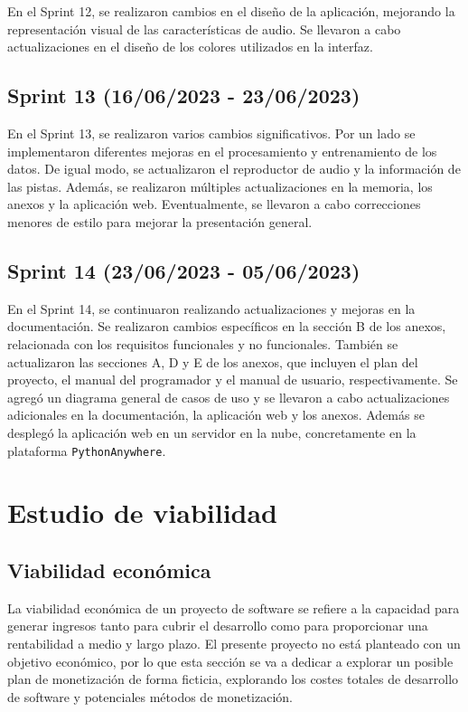 En el Sprint 12, se realizaron cambios en el diseño de la aplicación, mejorando la representación visual de las características de audio. Se llevaron a cabo actualizaciones en el diseño de los colores utilizados en la interfaz.

\subsection{Sprint 13 (16/06/2023 - 23/06/2023)}

En el Sprint 13, se realizaron varios cambios significativos. Por un lado se implementaron diferentes mejoras en el procesamiento y entrenamiento de los datos. De igual modo, se actualizaron el reproductor de audio y la información de las pistas. Además, se realizaron múltiples actualizaciones en la memoria, los anexos y la aplicación web. Eventualmente, se llevaron a cabo correcciones menores de estilo para mejorar la presentación general.

\subsection{Sprint 14 (23/06/2023 - 05/06/2023)}

En el Sprint 14, se continuaron realizando actualizaciones y mejoras en la documentación. Se realizaron cambios específicos en la sección B de los anexos, relacionada con los requisitos funcionales y no funcionales. También se actualizaron las secciones A, D y E de los anexos, que incluyen el plan del proyecto, el manual del programador y el manual de usuario, respectivamente. Se agregó un diagrama general de casos de uso y se llevaron a cabo actualizaciones adicionales en la documentación, la aplicación web y los anexos. Además se desplegó la aplicación web en un servidor en la nube, concretamente en la plataforma \texttt{PythonAnywhere}.

\section{Estudio de viabilidad}

\subsection{Viabilidad económica}

La viabilidad económica de un proyecto de software se refiere a la capacidad para generar ingresos tanto para cubrir el desarrollo como para proporcionar una rentabilidad a medio y largo plazo. El presente proyecto no está planteado con un objetivo económico, por lo que esta sección se va a dedicar a explorar un posible plan de monetización de forma ficticia, explorando los costes totales de desarrollo de software y potenciales métodos de monetización.

